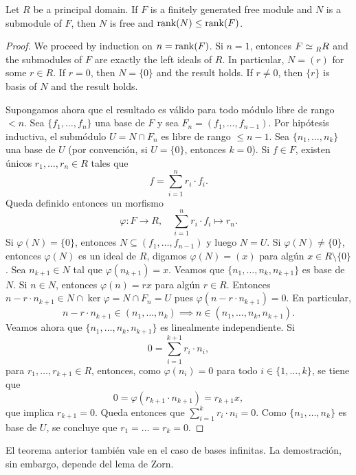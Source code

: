 \lecture{}


\begin{theorem}
\label{thm:rango}
Let $R$ be a principal domain. If $F$ is a finitely generated free module and 
$N$ is a submodule of $F$, then $N$ is free and 
$\operatorname{rank}(N)\leq\operatorname{rank}(F)$. 
\end{theorem}

\begin{proof}
	We proceed by induction on $n=\operatorname{rank}(F)$. Si $n=1$, entonces
	$F\simeq\prescript{}{R}R$ 
	and the submodules of $F$ are exactly the left ideals of $R$. In particular,
	$N=(r)$ for some $r\in R$. If $r=0$, then $N=\{0\}$ and the result holds. If $r\ne 0$, then 
	$\{r\}$ is basis of $N$ and the result holds.
	
	Supongamos ahora que el resultado es válido para todo módulo libre de rango $<n$. 
	Sea $\{f_1,\dots,f_n\}$ una
	base de $F$ y sea $F_n=(f_1,\dots,f_{n-1})$. Por hipótesis inductiva, 
	el submódulo $U=N\cap F_n$ es libre de rango $\leq n-1$. Sea
	$\{n_1,\dots,n_k\}$ una base de $U$ (por convención, si $U=\{0\}$, entonces $k=0$). Si $f\in F$, existen únicos $r_1,\dots,r_n\in R$ tales que 
	\[
	f=\sum_{i=1}^n r_i\cdot f_i.
	\]
	Queda definido 
	entonces un morfismo 
	\[
	\varphi\colon F\to R,
	\quad
	\sum_{i=1}^nr_i\cdot f_i\mapsto r_n.
	\] 
	Si $\varphi(N)=\{0\}$, entonces $N\subseteq (f_1,\dots,f_{n-1})$ y luego $N=U$. 
	Si $\varphi(N)\ne\{0\}$, entonces $\varphi(N)$ es un ideal
	de $R$, digamos $\varphi(N)=(x)$ para algún $x\in R\setminus\{0\}$. Sea $n_{k+1}\in N$ 
	tal que $\varphi(n_{k+1})=x$. 
	Veamos que $\{n_1,\dots,n_k,n_{k+1}\}$ es base de $N$. 
	Si $n\in N$, entonces $\varphi(n)=rx$ 
	para algún $r\in R$. Entonces $n-r\cdot n_{k+1}\in N\cap\ker\varphi=N\cap F_n=U$ pues 
	$\varphi(n-r\cdot n_{k+1})=0$. En particular, 
	\[
	n-r\cdot n_{k+1}\in (n_1,\dots,n_k)\implies  
	n\in (n_1,\dots,n_k,n_{k+1}).
	\]
	Veamos ahora que
	$\{n_1,\dots,n_k,n_{k+1}\}$ es linealmente independiente. Si 
	\[
	0=\sum_{i=1}^{k+1}r_i\cdot n_i,
	\]
	para $r_1,\dots,r_{k+1}\in R$, entonces, como $\varphi(n_i)=0$ para todo $i\in\{1,\dots,k\}$, se tiene que 
	\[
	0=\varphi(r_{k+1}\cdot n_{k+1})=r_{k+1}x,
	\]
	que implica $r_{k+1}=0$. Queda entonces que $\sum_{i=1}^kr_i\cdot n_i=0$. Como $\{n_1,\dots,n_k\}$ es base de $U$, se concluye que
	$r_1=\dots=r_k=0$. 
\end{proof}

El teorema anterior también vale en el caso de bases infinitas. La demostración, sin embargo, depende del lema de Zorn.
	
